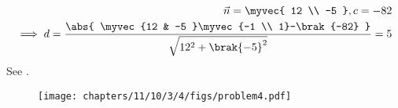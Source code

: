 \begin{align}
		\vec{n} = \myvec{
	  12 \\
	  -5 
	  } ,   c = -82 
	  \\
	  \implies 
	d 
	= \frac{\abs{  \myvec{12 & -5 }\myvec{-1 \\ 1}-\brak{-82} }}{\sqrt{12^2+\brak{-5}^2}} 	
	= 5
\end{align}
See .
\begin{figure}[H]
	\begin{center}
		\texttt{[image: chapters/11/10/3/4/figs/problem4.pdf]}
	\end{center}
\caption{}
\label{fig:11/10/3/4/Fig1}
\end{figure}

